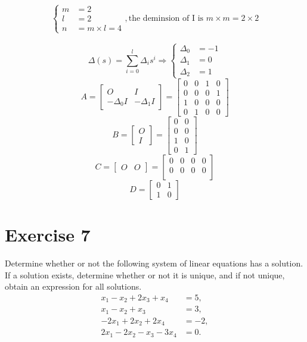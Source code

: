 \documentclass[12pt,a4paper]{article}
\begin{document}
\begin{align*}
	\begin{cases}
		m &= 2 \\
		l &= 2 \\
		n &= m \times l = 4
	\end{cases}, \text{the deminsion of I is } m \times m = 2 \times 2
\end{align*}

\[
\Delta(s) = \sum_{i = 0}^l \Delta_i s^i \Rightarrow \begin{cases}
	\Delta_0 &= -1 \\
	\Delta_1 &= 0 \\
	\Delta_2 &= 1
\end{cases}
\]
\[
A = \begin{bmatrix}
	O & I \\
	-\Delta_0I & -\Delta_1I
\end{bmatrix} = \begin{bmatrix}
0 & 0 & 1 & 0 \\
0 & 0 & 0 & 1 \\
1 & 0 & 0 & 0 \\
0 & 1 & 0 & 0 
\end{bmatrix}
\]
\[
B = \begin{bmatrix}
	O \\ I
\end{bmatrix} = \begin{bmatrix}
 0 & 0 \\
 0 & 0 \\
 1 & 0 \\
  0 & 1 
\end{bmatrix}
\]
\[
C = \begin{bmatrix}
	O & O 
\end{bmatrix} = \begin{bmatrix}
0 & 0 & 0 & 0 \\
0 & 0 & 0 & 0 \\
\end{bmatrix}
\]
\[
D = \begin{bmatrix}
	0 & 1 \\ 1 & 0
\end{bmatrix}
\]

\break\vspace{3cm}
\Needspace{10cm}
\section*{Exercise 7}
Determine whether or not the following system of linear equations has a solution.
If a solution exists, determine whether or not it is unique, and if not unique,
obtain an expression for all solutions.
\[
\begin{aligned}
x_1-x_2+2x_3+x_4 &= 5,\\
x_1-x_2+x_3 &= 3,\\
-2x_1+2x_2+2x_4 &= -2,\\
2x_1-2x_2-x_3-3x_4 &= 0.
\end{aligned}
\]
\end{document}
